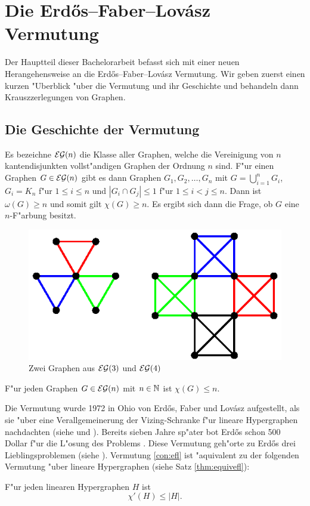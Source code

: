\section{Die Erd\H{o}s--Faber--Lov\'asz Vermutung}
Der Hauptteil dieser Bachelorarbeit befasst sich mit einer neuen Herangehensweise an die Erd\H{o}s--Faber--Lov\'asz Vermutung. Wir geben zuerst einen kurzen "Uberblick "uber die Vermutung und ihr Geschichte und behandeln dann Krauszzerlegungen von Graphen. 
\subsection{Die Geschichte der Vermutung}
Es bezeichne ${\cal EG}(n)$ die Klasse aller Graphen, welche die Vereinigung von $n$ kantendisjunkten vollst"andigen Graphen der Ordnung $n$ sind. 
F"ur einen Graphen $G\in {\cal EG}(n)$ gibt es dann Graphen $G_1,G_2,\dots,G_n$ mit $G= \bigcup\limits_{i=1}^{n} G_i$, $G_i = K_n$ f"ur $1\leq i \leq n$ und $|G_i \cap G_j| \leq 1$ f"ur $1\leq i < j \leq n$. Dann ist $\omega(G) \geq n$ und somit gilt $\chi(G) \geq n$. Es ergibt sich dann die Frage, ob $G$ eine $n$-F"arbung besitzt.
\begin{figure}[h]
  \centering
  \includegraphics{images/bildeg3und4}
  \caption{Zwei Graphen aus ${\cal EG}(3)$ und ${\cal EG}(4)$}
  \label{fig:egraphen}
\end{figure}
\begin{conjecture}
  F"ur jeden Graphen $G\in{\cal EG}(n)$ mit $n\in{\mathbb{N}}$ ist $\chi(G) \leq n$.
  \label{con:efl}
\end{conjecture}

Die Vermutung wurde 1972 in Ohio von Erd\H{o}s, Faber und Lov\'asz aufgestellt, als sie "uber eine Verallgemeinerung der Vizing-Schranke f"ur lineare Hypergraphen nachdachten (siehe \cite{FaberL74} und \cite{Erdos76}). Bereits sieben Jahre sp"ater bot Erd\H{o}s \cite{Erdos79} schon 500 Dollar f"ur die L"osung des Problems .
Diese Vermutung geh"orte zu Erd\H{o}s drei Lieblingsproblemen (siehe \cite{Erdos81}).  
Vermutung \ref{con:efl} ist "aquivalent zu der folgenden Vermutung "uber lineare Hypergraphen (siehe Satz \ref{thm:equivefl}):
\begin{conjecture}
  F"ur jeden linearen Hypergraphen $H$ ist $$\chi'(H) \leq |H|.$$
  \label{con:eflhyper}
\end{conjecture}

